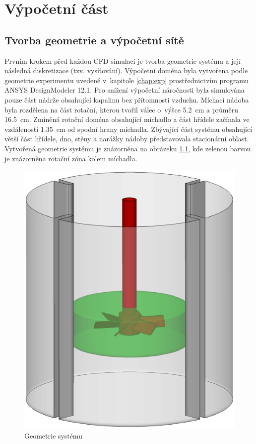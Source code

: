 \chapter{Výpočetní část}

\section{Tvorba geometrie a výpočetní sítě}

Prvním krokem před každou CFD simulací je tvorba geometrie systému a její následná diskretizace (tzv. vysíťování). Výpočetní doména byla vytvořena podle geometrie experimentu uvedené v~kapitole \ref{chap:exp} prostřednictvím programu ANSYS DesignModeler 12.1. Pro snížení výpočetní náročnosti byla simulována pouze část nádrže obsahující kapalinu bez přítomnosti vzduchu. Míchací nádoba byla rozdělena na část rotační, kterou tvořil válec o~výšce \SI{5.2}{\centi\meter} a průměru \SI{16.5}{\centi\meter}. Zmíněná rotační doména obsahující míchadlo a část hřídele začínala ve vzdálenosti \SI{1.35}{\centi\meter} od spodní hrany míchadla. Zbývající část systému obsahující větší část hřídele, dno, stěny a narážky nádoby představovala stacionární oblast. Vytvořená geometrie systému je znázorněna na obrázeku \ref{fig:geo}, kde zelenou barvou je znázorněna rotační zóna kolem míchadla. 

\begin{figure}[h!]
\centering
\includegraphics[scale=0.5]{images/geo.eps}
\caption{Geometrie systému}
\label{fig:geo}
\end{figure} 

